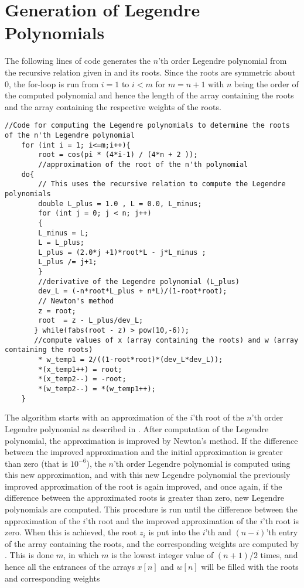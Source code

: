 \section{Generation of Legendre Polynomials}
\label{sec:GenerationOfLegendrePolynomials}
The following lines of code generates the $n$'th order Legendre polynomial from the recursive relation given in  and its roots.
Since the roots are symmetric about $0$, the for-loop is run from $i=1$ to $i<m$ for $m = n+1$ with $n$ being the order of the computed polynomial and hence the length of the array containing the roots and the array containing the respective weights of the roots. 
\begin{lstlisting}
//Code for computing the Legendre polynomials to determine the roots of the n'th Legendre polynomial
    for (int i = 1; i<=m;i++){
        root = cos(pi * (4*i-1) / (4*n + 2 ));  
        //approximation of the root of the n'th polynomial
    do{
        // This uses the recursive relation to compute the Legendre polynomials
        double L_plus = 1.0 , L = 0.0, L_minus;
        for (int j = 0; j < n; j++)
        {
        L_minus = L;
        L = L_plus;
        L_plus = (2.0*j +1)*root*L - j*L_minus ;
        L_plus /= j+1;
        }
		//derivative of the Legendre polynomial (L_plus)
        dev_L = (-n*root*L_plus + n*L)/(1-root*root);   
        // Newton's method
        z = root;
        root  = z - L_plus/dev_L;                   
       } while(fabs(root - z) > pow(10,-6));
       //compute values of x (array containing the roots) and w (array containing the roots)
        * w_temp1 = 2/((1-root*root)*(dev_L*dev_L));
        *(x_temp1++) = root;
        *(x_temp2--) = -root;
        *(w_temp2--) = *(w_temp1++);
    }
\end{lstlisting}
The algorithm starts with an approximation of the $i$'th root of the $n$'th order Legendre polynomial as described in . 
After computation of the Legendre polynomial, the approximation is improved by Newton's method.
If the difference between the improved approximation and the initial approximation is greater than zero (that is $10^{-6}$), the $n$'th order Legendre polynomial is computed using this new approximation, and with this new Legendre polynomial the previously improved approximation of the root is again improved, and once again, if the difference between the approximated roots is greater than zero, new Legendre polynomials are computed.  
This procedure is run until the difference between the approximation of the $i$'th root and the improved approximation of the $i$'th root is zero.
When this is achieved, the root $z_i$ is put into the $i$'th and $(n-i)$'th entry of the array containing the roots, and the corresponding weights are computed by .
This is done $m$, in which $m$ is the lowest integer value of $(n+1)/2$ times, and hence all the entrances of the arrays $x[n]$ and $w[n]$ will be filled with the roots and corresponding weights

